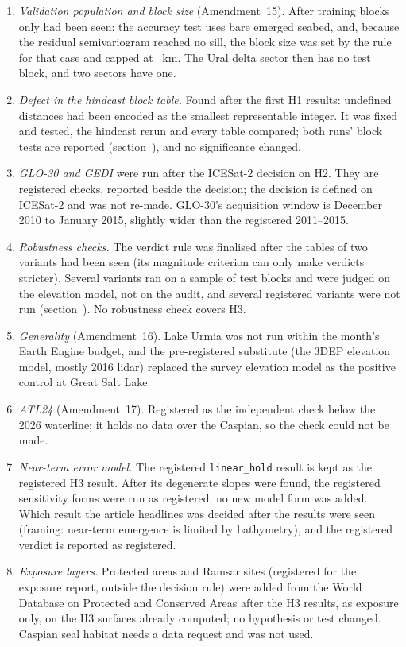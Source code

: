 \begin{enumerate}
\item \emph{Validation population and block size} (Amendment~15). After training blocks only had been seen: the accuracy test uses bare emerged seabed, and, because the residual semivariogram reached no sill, the block size was set by the rule for that case and capped at ~km. The Ural delta sector then has no test block, and two sectors have one.
\item \emph{Defect in the hindcast block table.} Found after the first H1 results: undefined distances had been encoded as the smallest representable integer. It was fixed and tested, the hindcast rerun and every table compared; both runs' block tests are reported (section~\SIaudit), and no significance changed.
\item \emph{GLO-30 and GEDI} were run after the ICESat-2 decision on H2. They are registered checks, reported beside the decision; the decision is defined on ICESat-2 and was not re-made. GLO-30's acquisition window is December 2010 to January 2015, slightly wider than the registered 2011--2015.
\item \emph{Robustness checks.} The verdict rule was finalised after the tables of two variants had been seen (its magnitude criterion can only make verdicts stricter). Several variants ran on a sample of test blocks and were judged on the elevation model, not on the audit, and several registered variants were not run (section~\SIrobust). No robustness check covers H3.
\item \emph{Generality} (Amendment~16). Lake Urmia was not run within the month's Earth Engine budget, and the pre-registered substitute (the 3DEP elevation model, mostly 2016 lidar\citep{quantumspatial2017_gsl}) replaced the survey elevation model as the positive control at Great Salt Lake.
\item \emph{ATL24} (Amendment~17). Registered as the independent check below the 2026 waterline; it holds no data over the Caspian, so the check could not be made.
\item \emph{Near-term error model.} The registered \texttt{linear\_hold} result is kept as the registered H3 result. After its degenerate slopes were found, the registered sensitivity forms were run as registered; no new model form was added. Which result the article headlines was decided after the results were seen (framing: near-term emergence is limited by bathymetry), and the registered verdict is reported as registered.
\item \emph{Exposure layers.} Protected areas and Ramsar sites (registered for the exposure report, outside the decision rule) were added from the World Database on Protected and Conserved Areas after the H3 results, as exposure only, on the H3 surfaces already computed; no hypothesis or test changed. Caspian seal habitat needs a data request and was not used.

\end{enumerate}
